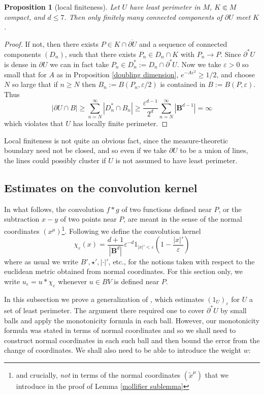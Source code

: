 \documentclass[reqno,12pt,letterpaper]{amsart}
\newcommand{\Ball}{\mathbf{B}}
\newtheorem{proposition}[theorem]{Proposition}
\theoremstyle{definition}
\numberwithin{equation}{section}
\begin{document}
\begin{proposition}[local finiteness]\label{local finiteness}
Let $U$ have least perimeter in $M$, $K \Subset M$ compact, and $d \leq 7$. Then only finitely many connected components of $\partial U$ meet $K$.
\end{proposition}
\begin{proof}
If not, then there exists $P \in K \cap \overline{\partial U}$ and a sequence of connected components $(D_n)$, such that there exists $P_n \in D_n \cap K$ with $P_n \to P$.
Since $\partial^* U$ is dense in $\partial U$ we can in fact take $P_n \in D_n^* := D_n \cap \partial^* U$.
Now we take $\varepsilon > 0$ so small that for $A$ as in Proposition \ref{doubling dimension}, $e^{-A\varepsilon^2} \geq 1/2$, and choose $N$ so large that if $n \geq N$ then $B_n := B(P_n, \varepsilon/2)$ is contained in $B := B(P, \varepsilon)$.
Thus
$$|\partial U \cap B| \geq \sum_{n=N}^\infty |D_n^* \cap B_n| \geq \frac{\varepsilon^{d - 1}}{2^d} \sum_{n=N}^\infty |\Ball^{d - 1}| = \infty$$
which violates that $U$ has locally finite perimeter.
\end{proof}

Local finiteness is not quite an obvious fact, since the measure-theoretic boundary need not be closed, and so even if we take $\partial U$ to be a union of lines, the lines could possibly cluster if $U$ is not assumed to have least perimeter.

\subsection{Estimates on the convolution kernel}
In what follows, the convolution $f * g$ of two functions defined near $P$, or the subtraction $x - y$ of two points near $P$, are meant in the sense of the normal coordinates $(x^\mu)$\footnote{and crucially, \emph{not} in terms of the normal coordinates $(\tilde x^\mu)$ that we introduce in the proof of Lemma \ref{mollifier sublemma}}. Following \cite[Chapter 7]{Giusti77} we define the convolution kernel
$$\chi_\varepsilon(x) = \frac{d + 1}{|\Ball^d|} \varepsilon^{-d}1_{|x|' < \varepsilon} \left(1 - \frac{|x|'}{\varepsilon}\right)$$
where as usual we write $B', \star', |\cdot|'$, etc., for the notions taken with respect to the euclidean metric obtained from normal coordinates.
For this section only, we write $u_\varepsilon = u * \chi_\varepsilon$ whenever $u \in BV$ is defined near $P$.

In this subsection we prove a generalization of \cite[Theorem 7.3]{Giusti77}, which estimates $(1_U)_\varepsilon$ for $U$ a set of least perimeter.
The argument there required one to cover $\partial^* U$ by small balls and apply the monotonicity formula in each ball.
However, our monotonicity formula was stated in terms of normal coordinates and so we shall need to construct normal coordinates in each such ball and then bound the error from the change of coordinates.
We shall also need to be able to introduce the weight $w$:
\end{document}
